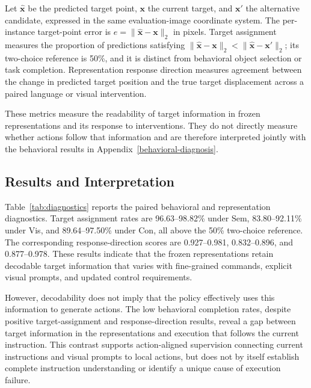 Let $\hat{\mathbf{x}}$ be the predicted target point, $\mathbf{x}$ the
current target, and $\mathbf{x}'$ the alternative candidate, expressed in
the same evaluation-image coordinate system. The per-instance target-point
error is $e=\lVert\hat{\mathbf{x}}-\mathbf{x}\rVert_2$ in pixels. Target
assignment measures the proportion of predictions satisfying
$\lVert\hat{\mathbf{x}}-\mathbf{x}\rVert_2 <
\lVert\hat{\mathbf{x}}-\mathbf{x}'\rVert_2$; its two-choice reference is
50\%, and it is distinct from behavioral object selection or task completion.
Representation response direction measures agreement between the change
in predicted target position and the true target displacement across a
paired language or visual intervention.

These metrics measure the readability of target information in frozen
representations and its response to interventions. They do not directly
measure whether actions follow that information and are therefore
interpreted jointly with the behavioral results in Appendix~\ref{behavioral-diagnosis}.

\subsection{Results and Interpretation}
\label{representation-diagnosis}

\Needspace{0.28\textheight}
%

Table~\ref{tab:diagnostics} reports the paired behavioral and representation diagnostics. Target
assignment rates are 96.63--98.82\% under Sem, 83.80--92.11\% under Vis, and 89.64--97.50\% under
Con, all above the 50\% two-choice reference. The corresponding response-direction scores are
0.927--0.981, 0.832--0.896, and 0.877--0.978. These results indicate that the frozen representations
retain decodable target information that varies with fine-grained commands, explicit visual prompts,
and updated control requirements.

However, decodability does not imply that the policy effectively uses this information to generate
actions. The low behavioral completion rates, despite positive target-assignment and
response-direction results, reveal a gap between target information in the representations and
execution that follows the current instruction. This contrast supports action-aligned supervision
connecting current instructions and visual prompts to local actions, but does not by itself
establish complete instruction understanding or identify a unique cause of execution failure.

